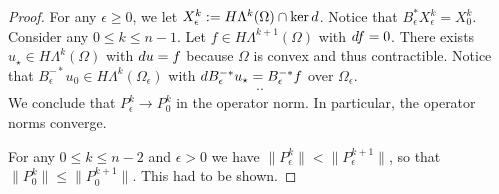 \documentclass[12pt,a4paper]{article}
\begin{document}
\begin{proof}
    For any $\epsilon \geq 0$, we let $X^{k}_{\epsilon} := H\Lambda^{k}(\Omega) \cap \ker d$. 
    Notice that $B_{\epsilon}^{\ast} X^{k}_{\epsilon} = X^{k}_{0}$. 
    Consider any $0 \leq k \leq n-1$. 
    Let $f \in H\Lambda^{k+1}(\Omega)$ with $d f = 0$.
    There exists $u_\star \in H\Lambda^{k}(\Omega)$ with $d u = f$ 
    because $\Omega$ is convex and thus contractible. %
    Notice that $B_{\epsilon}^{-\ast} u_0 \in H\Lambda^{k}(\Omega_{\epsilon})$ 
    with $d B_{\epsilon}^{-\ast} u_\star = B_{\epsilon}^{-\ast} f$ over $\Omega_{\epsilon}$.
    \begin{align*}
        ..
    \end{align*}
    We conclude that $P^{k}_{\epsilon} \rightarrow P^{k}_{0}$ in the operator norm. 
    In particular, the operator norms converge. 
    
    For any $0 \leq k \leq n-2$ and $\epsilon > 0$ we have $\| P^{k}_{\epsilon} \| < \| P^{k+1}_{\epsilon} \|$,
    so that $\| P^{k}_{0} \| \leq \| P^{k+1}_{0} \|$.
    This had to be shown.
%     
\end{proof}
\end{document}
